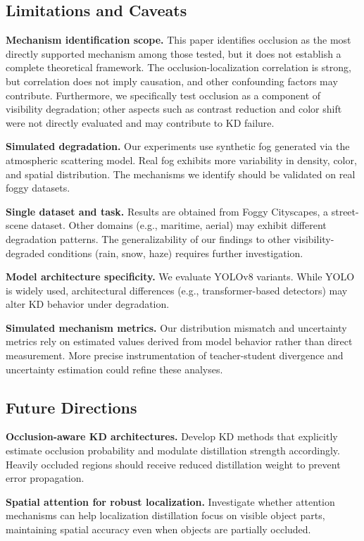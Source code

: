 \subsection{Limitations and Caveats}

\textbf{Mechanism identification scope.} This paper identifies occlusion as the most directly supported mechanism among those tested, but it does not establish a complete theoretical framework. The occlusion-localization correlation is strong, but correlation does not imply causation, and other confounding factors may contribute. Furthermore, we specifically test occlusion as a component of visibility degradation; other aspects such as contrast reduction and color shift were not directly evaluated and may contribute to KD failure.

\textbf{Simulated degradation.} Our experiments use synthetic fog generated via the atmospheric scattering model. Real fog exhibits more variability in density, color, and spatial distribution. The mechanisms we identify should be validated on real foggy datasets.

\textbf{Single dataset and task.} Results are obtained from Foggy Cityscapes, a street-scene dataset. Other domains (e.g., maritime, aerial) may exhibit different degradation patterns. The generalizability of our findings to other visibility-degraded conditions (rain, snow, haze) requires further investigation.

\textbf{Model architecture specificity.} We evaluate YOLOv8 variants. While YOLO is widely used, architectural differences (e.g., transformer-based detectors) may alter KD behavior under degradation.

\textbf{Simulated mechanism metrics.} Our distribution mismatch and uncertainty metrics rely on estimated values derived from model behavior rather than direct measurement. More precise instrumentation of teacher-student divergence and uncertainty estimation could refine these analyses.

\subsection{Future Directions}

\textbf{Occlusion-aware KD architectures.} Develop KD methods that explicitly estimate occlusion probability and modulate distillation strength accordingly. Heavily occluded regions should receive reduced distillation weight to prevent error propagation.

\textbf{Spatial attention for robust localization.} Investigate whether attention mechanisms can help localization distillation focus on visible object parts, maintaining spatial accuracy even when objects are partially occluded.

